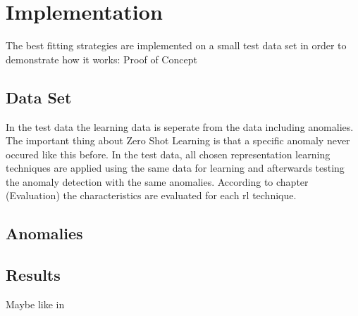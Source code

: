 \chapter{Implementation}\label{implementation}
The best fitting strategies are implemented on a small test data set in order to demonstrate how it works: Proof of Concept\\
\section{Data Set}
In the test data the learning data is seperate from the data including anomalies. The important thing about Zero Shot Learning is that a specific anomaly never occured like this before. In the test data, all chosen representation learning techniques are applied using the same data for learning and afterwards testing the anomaly detection with the same anomalies. According to chapter (Evaluation) the characteristics are evaluated for each rl technique.\\
\section{Anomalies}
\section{Results}
Maybe like in 
